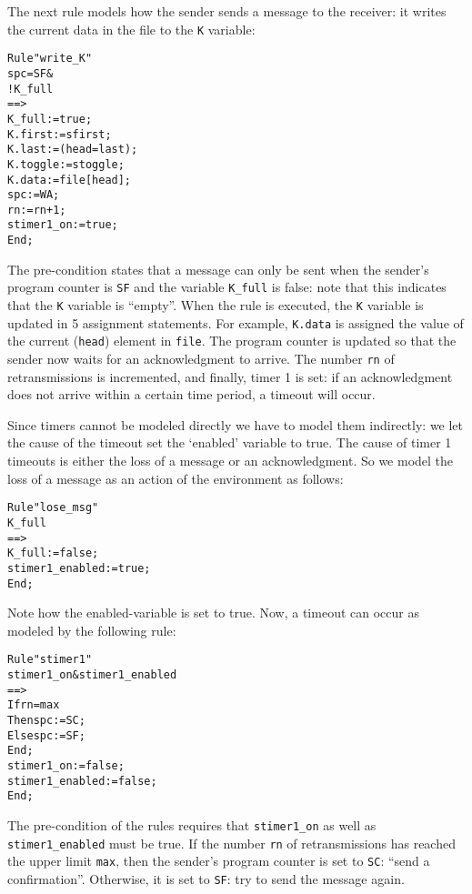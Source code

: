 The next rule models how the sender sends a message to the receiver:
it writes the current data in the file to the {\tt K} variable:

\begin{alltt}
  Rule "write_K"
    spc = SF &
    !K_full
      ==>
    K_full := true;
    K.first := sfirst;
    K.last := (head = last);
    K.toggle:= stoggle;
    K.data := file[head];
    spc:= WA;
    rn := rn+1;
    stimer1_on := true;
  End;
\end{alltt}

The pre-condition  states that  a message can  only  be sent when  the
sender's program counter is {\tt SF} and  the variable {\tt K\_full}
is false: note that this indicates that the {\tt K}
variable is ``empty''. When the rule  is executed, the {\tt K} variable
is updated in 5 assignment statements.   For example, {\tt K.data}  is
assigned the value of the current ({\tt head}) element in {\tt file}.
The program counter is  updated  so that the  sender  now waits for an
acknowledgment to arrive. The number {\tt rn} of retransmissions is
incremented, and finally, timer 1 is set: if an acknowledgment does not 
arrive within a certain time period, a timeout will occur. 

Since  timers cannot be  modeled  directly  we  have  to  model  them
indirectly: we let the cause of the timeout set the `enabled' variable
to true. The cause of timer 1 timeouts is either the loss of a message
or an acknowledgment. So we model the loss of a message as an action
of the environment as follows:

\begin{alltt}
  Rule "lose_msg"
    K_full 
    ==> 
    K_full := false;
    stimer1_enabled := true;
  End;
\end{alltt}

Note how the enabled-variable is set to true. Now, a timeout can occur
as modeled by the following rule:

\begin{alltt}
  Rule "stimer1"
    stimer1_on & stimer1_enabled 
      ==>
    If rn = max
       Then spc := SC;
       Else spc := SF;
    End;
    stimer1_on := false;
    stimer1_enabled := false;
  End;
\end{alltt}

The  pre-condition of  the rules requires  that {\tt stimer1\_on}  as
well as  {\tt stimer1\_enabled} must be true. If the number {\tt rn}
of  retransmissions  has reached the upper limit {\tt max},  then the
sender's program  counter is set to {\tt SC}: ``send  a confirmation''.
Otherwise, it is set to {\tt SF}: try to send the message again.

